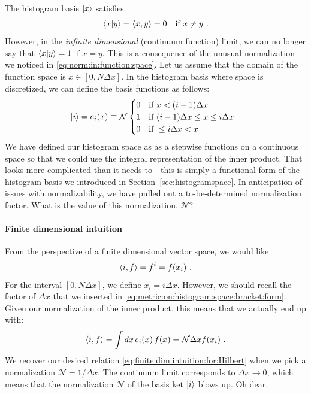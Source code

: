 The histogram basis $\left|x\right\rangle$ satisfies
\begin{align}
    \langle x | y \rangle = \langle x, y \rangle = 0 \quad \textnormal{if } x\neq y \ .
\end{align}
However, in the \emph{infinite dimensional} (continuum function) limit, we can no longer say that $\langle x | y \rangle = 1$ if $x=y$. This is a consequence of the unusual normalization we noticed in \eqref{eq:norm:in:function:space}. Let us assume that the domain of the function space is $x\in [0,N\Delta x]$. In the histogram basis where space is discretized, we can define the basis functions as follows:
\begin{align}
    \left|i\right\rangle = 
    e_i(x) \equiv 
    \mathcal N
    \begin{cases}
    0 &\textnormal{if } x< (i-1)\Delta x\\
    1 &\textnormal{if } (i-1)\Delta x \leq x \leq i\Delta x\\
    0 &\textnormal{if } \leq i\Delta x < x 
    \end{cases}    \ .
\end{align}
We have defined our histogram space as as a stepwise functions on a continuous space so that we could use the integral representation of the inner product. That looks more complicated than it needs to---this is simply a functional form of the histogram basis we introduced in Section~\ref{sec:histogramspace}. In anticipation of issues with normalizability, we have pulled out a to-be-determined normalization factor. What is the value of this normalization, $\mathcal N$? 

\paragraph{Finite dimensional intuition}
From the perspective of a finite dimensional vector space, we would like
\begin{align}
    \langle i,f\rangle = f^i = f(x_i) \ .
    \label{eq:finite:dim:intuition:for:Hilbert}
\end{align}
For the interval $[0,N\Delta x]$, we define $x_i = i\Delta x$. However, we should recall the factor of $\Delta x$ that we inserted in \eqref{eq:metric:on:histogram:space:bracket:form}. 
Given our normalization of the inner product, this means that we actually end up with:
\begin{align}
    \la i, f\ra = \int dx\, e_i(x)\, f(x) = \mathcal N \Delta x f(x_i) \ .
    \label{eq:basis:normalization:of:function:space}
\end{align}
We recover our desired relation \eqref{eq:finite:dim:intuition:for:Hilbert} when we pick a normalization $\mathcal N = 1/\Delta x$. The continuum limit corresponds to $\Delta x \to 0$, which means that the normalization $\mathcal N$ of the basis ket $\left|i\right\rangle$ blows up. Oh dear. 

